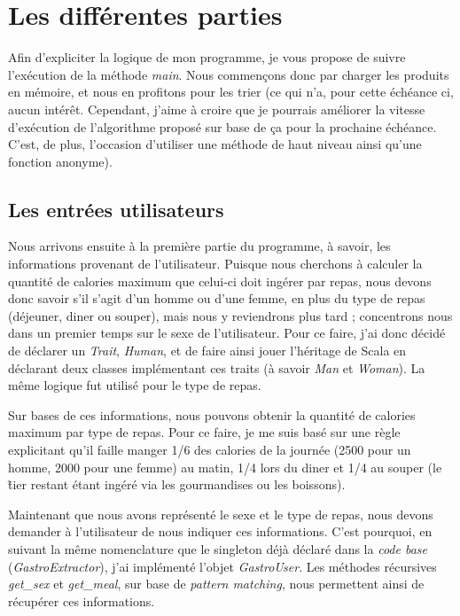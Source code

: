 \section{Les différentes parties}
Afin d'expliciter la logique de mon programme, je vous propose de suivre l'exécution de la méthode \textit{main}. 
Nous commençons donc par charger les produits en mémoire, et nous en profitons pour les trier (ce qui n'a, pour cette échéance ci, aucun intérêt. Cependant, j'aime à croire que je pourrais améliorer la vitesse d'exécution de l'algorithme proposé sur base de ça pour la prochaine échéance. C'est, de plus, l'occasion d'utiliser une méthode de haut niveau ainsi qu'une fonction anonyme).

\subsection{Les entrées utilisateurs}
Nous arrivons ensuite à la première partie du programme, à savoir, les informations provenant de l'utilisateur. Puisque nous cherchons à calculer la quantité de calories maximum que celui-ci doit ingérer par repas, nous devons donc savoir s'il s'agit d'un homme ou d'une femme, en plus du type de repas (déjeuner, diner ou souper), mais nous y reviendrons plus tard ; concentrons nous dans un premier temps sur le sexe de l'utilisateur. Pour ce faire, j'ai donc décidé de déclarer un \textit{Trait}, \textit{Human}, et de faire ainsi jouer l'héritage de Scala en déclarant deux classes implémentant ces traits (à savoir \textit{Man} et \textit{Woman}). La même logique fut utilisé pour le type de repas. 

Sur bases de ces informations, nous pouvons obtenir la quantité de calories maximum par type de repas. Pour ce faire, je me suis basé sur une règle explicitant qu'il faille manger 1/6 des calories de la journée (2500 pour un homme, 2000 pour une femme) au matin, 1/4 lors du diner et 1/4 au souper (le \~ tier restant étant ingéré via les gourmandises ou les boissons).  

Maintenant que nous avons représenté le sexe et le type de repas, nous devons demander à l'utilisateur de nous indiquer ces informations. C'est pourquoi, en suivant la même nomenclature que le singleton déjà déclaré dans la \textit{code base} (\textit{GastroExtractor}), j'ai implémenté l'objet \textit{GastroUser}. Les méthodes récursives \textit{get\_sex} et \textit{get\_meal}, sur base de \textit{pattern matching}, nous permettent ainsi de récupérer ces informations.
 
